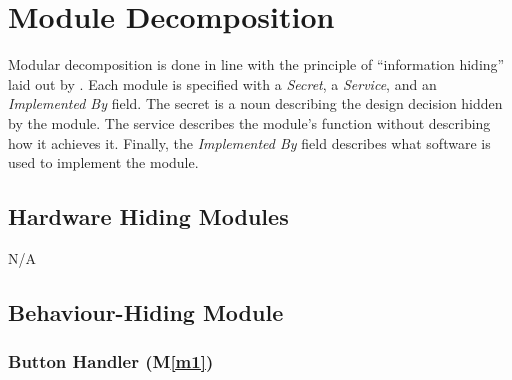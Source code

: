 \documentclass[12pt, titlepage]{article}
\newcommand{\mref}[1]{M\ref{#1}}
\begin{document}
\section{Module Decomposition} \label{SecMD}

Modular decomposition is done in line with the principle of ``information hiding''
laid out by \citet{ParnasEtAl1984}. Each module is specified with a \emph{Secret}, a \emph{Service}, and an \emph{Implemented By} field. The secret is a noun describing the design decision hidden by the module. The service describes the module's function without describing how it achieves it. Finally, the \emph{Implemented By} field describes what software is used to implement the module.

\subsection{Hardware Hiding Modules}
N/A

\subsection{Behaviour-Hiding Module}


\subsubsection{Button Handler (\mref{m1})}
\end{document}
